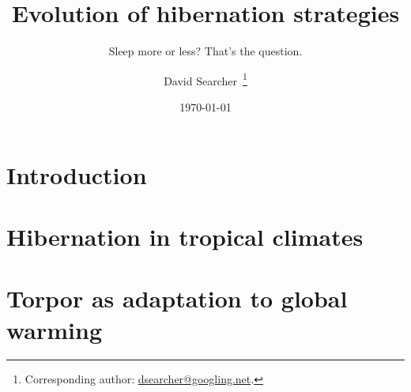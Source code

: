 \title{Evolution of hibernation strategies}
\subtitle{Sleep more or less? That's the question.}
\author{David Searcher\,
\thanks{Corresponding author: \href{mailto:dsearcher@googling.net}{dsearcher@googling.net}.}}
\date{\today}
\maketitle
\section{Introduction}\lipsum[23-24]
\section{Hibernation in tropical climates}\lipsum[25-32]
\section{Torpor as adaptation to global warming}\lipsum[33-39]